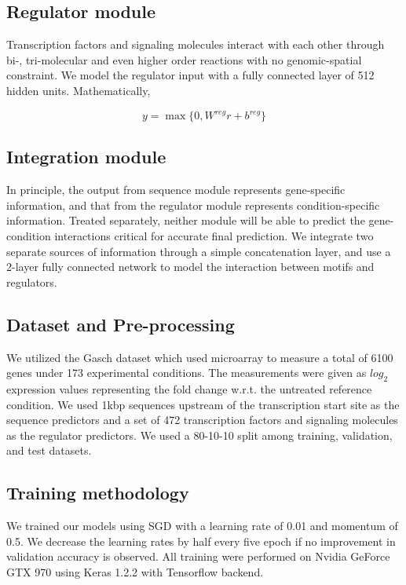 \documentclass{article}
\begin{document}
\subsection{Regulator module}
Transcription factors and signaling molecules interact with each other through bi-, tri-molecular and even higher order reactions with no genomic-spatial constraint. We model the regulator input with a fully connected layer of 512 hidden units. Mathematically, 

\begin{equation} \label{eq2}
y=\max \{0, W^{reg}r + b^{reg}\}
\end{equation}

\subsection{Integration module}
In principle, the output from sequence module represents gene-specific information, and that from the regulator module represents condition-specific information. Treated separately, neither module will be able to predict the gene-condition interactions critical for accurate final prediction. We integrate two separate sources of information through a simple concatenation layer, and use a 2-layer fully connected network to model the interaction between motifs and regulators. 

\subsection{Dataset and Pre-processing}

We utilized the Gasch \cite{Gasch:2000wl} dataset which used microarray to measure a total of 6100 genes under 173 experimental conditions. The measurements were given as $log_2$ expression values representing the fold change w.r.t. the untreated reference condition. We used 1kbp sequences upstream of the transcription start site as the sequence predictors and a set of 472 transcription factors and signaling molecules as the regulator predictors. We used a 80-10-10 split among training, validation, and test datasets.


\subsection{Training methodology}
We trained our models using SGD with a learning rate of 0.01 and momentum of 0.5. We decrease the learning rates by half every five epoch if no improvement in validation accuracy is observed. All training were performed on Nvidia GeForce GTX 970 using Keras 1.2.2 with Tensorflow backend.
\end{document}

